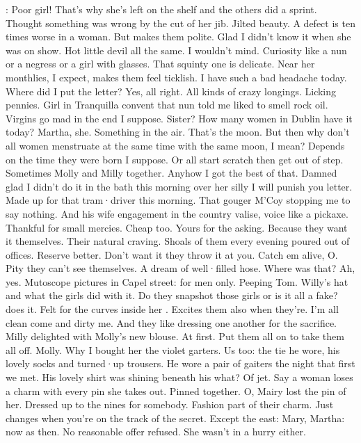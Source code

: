 \Bloom:
Poor girl!
That's why
she's left on the shelf
and the others did a sprint.
Thought something was wrong
by the cut of her jib.
Jilted beauty.
A defect is ten times worse in a woman.
But makes them polite.
Glad I didn't know it
when she was on show.
Hot little devil
all the same.
I wouldn't mind.
Curiosity
like a nun
or a negress
or a girl with glasses.
That squinty one is delicate.
Near her monthlies,
I expect,
makes them feel ticklish.
I have such a bad headache today.
Where did I put the letter?
Yes,
all right.
All kinds of crazy longings.
Licking pennies.
Girl in Tranquilla convent
that nun told me
liked to smell rock oil.
Virgins go mad in the end
I suppose.
Sister?
How many women in Dublin have it today?
Martha,
she.
Something in the air.
That's the moon.
But then
why don't all women menstruate
at the same time
with the same moon,
I mean?
Depends on the time they were born
I suppose.
Or all start scratch
then get out of step.
Sometimes Molly and Milly together.
Anyhow I got the best of that.
Damned glad
I didn't do it in the bath this morning
over her silly
I will punish you letter.
Made up for that tram·driver this morning.
That gouger M'Coy stopping me
to say nothing.
And his wife engagement
in the country valise,
voice like a pickaxe.
Thankful for small mercies.
Cheap too.
Yours for the asking.
Because they want it themselves.
Their natural craving.
Shoals of them every evening
poured out of offices.
Reserve better.
Don't want it
they throw it at you.
Catch em alive,
O.
Pity they can't see themselves.
A dream of well·filled hose.
Where was that?
Ah,
yes.
Mutoscope pictures in Capel street:
for men only.
Peeping Tom.
Willy's hat
and what the girls did with it.
Do they snapshot those girls
or is it all a fake?
 does it.
Felt for the curves inside her .
Excites them also
when they're.
I'm all clean
come and dirty me.
And they like dressing one another
for the sacrifice.
Milly delighted with Molly's new blouse.
At first.
Put them all on
to take them all off.
Molly.
Why I bought her the violet garters.
Us too:
the tie he wore,
his lovely socks and turned·up trousers.
He wore a pair of gaiters
the night that first we met.
His lovely shirt was shining
beneath his what?
Of jet.
Say a woman loses a charm
with every pin she takes out.
Pinned together.
O,
Mairy lost the pin of her.
Dressed up to the nines for somebody.
Fashion part of their charm.
Just changes
when you're on the track of the secret.
Except the east:
Mary,
Martha:
now as then.
No reasonable offer refused.
She wasn't in a hurry either.

